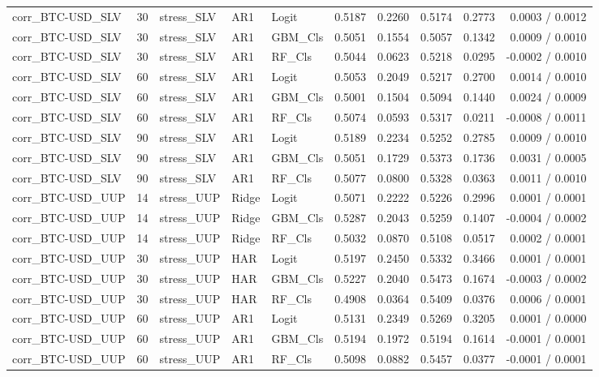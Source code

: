 \begin{table}[H]
\begin{tabular}{lllllrrrrr}
corr_BTC-USD_SLV & 30 & stress_SLV & AR1 & Logit & 0.5187 & 0.2260 & 0.5174 & 0.2773 & 0.0003 / 0.0012 \\
corr_BTC-USD_SLV & 30 & stress_SLV & AR1 & GBM_Cls & 0.5051 & 0.1554 & 0.5057 & 0.1342 & 0.0009 / 0.0010 \\
corr_BTC-USD_SLV & 30 & stress_SLV & AR1 & RF_Cls & 0.5044 & 0.0623 & 0.5218 & 0.0295 & -0.0002 / 0.0010 \\
corr_BTC-USD_SLV & 60 & stress_SLV & AR1 & Logit & 0.5053 & 0.2049 & 0.5217 & 0.2700 & 0.0014 / 0.0010 \\
corr_BTC-USD_SLV & 60 & stress_SLV & AR1 & GBM_Cls & 0.5001 & 0.1504 & 0.5094 & 0.1440 & 0.0024 / 0.0009 \\
corr_BTC-USD_SLV & 60 & stress_SLV & AR1 & RF_Cls & 0.5074 & 0.0593 & 0.5317 & 0.0211 & -0.0008 / 0.0011 \\
corr_BTC-USD_SLV & 90 & stress_SLV & AR1 & Logit & 0.5189 & 0.2234 & 0.5252 & 0.2785 & 0.0009 / 0.0010 \\
corr_BTC-USD_SLV & 90 & stress_SLV & AR1 & GBM_Cls & 0.5051 & 0.1729 & 0.5373 & 0.1736 & 0.0031 / 0.0005 \\
corr_BTC-USD_SLV & 90 & stress_SLV & AR1 & RF_Cls & 0.5077 & 0.0800 & 0.5328 & 0.0363 & 0.0011 / 0.0010 \\
corr_BTC-USD_UUP & 14 & stress_UUP & Ridge & Logit & 0.5071 & 0.2222 & 0.5226 & 0.2996 & 0.0001 / 0.0001 \\
corr_BTC-USD_UUP & 14 & stress_UUP & Ridge & GBM_Cls & 0.5287 & 0.2043 & 0.5259 & 0.1407 & -0.0004 / 0.0002 \\
corr_BTC-USD_UUP & 14 & stress_UUP & Ridge & RF_Cls & 0.5032 & 0.0870 & 0.5108 & 0.0517 & 0.0002 / 0.0001 \\
corr_BTC-USD_UUP & 30 & stress_UUP & HAR & Logit & 0.5197 & 0.2450 & 0.5332 & 0.3466 & 0.0001 / 0.0001 \\
corr_BTC-USD_UUP & 30 & stress_UUP & HAR & GBM_Cls & 0.5227 & 0.2040 & 0.5473 & 0.1674 & -0.0003 / 0.0002 \\
corr_BTC-USD_UUP & 30 & stress_UUP & HAR & RF_Cls & 0.4908 & 0.0364 & 0.5409 & 0.0376 & 0.0006 / 0.0001 \\
corr_BTC-USD_UUP & 60 & stress_UUP & AR1 & Logit & 0.5131 & 0.2349 & 0.5269 & 0.3205 & 0.0001 / 0.0000 \\
corr_BTC-USD_UUP & 60 & stress_UUP & AR1 & GBM_Cls & 0.5194 & 0.1972 & 0.5194 & 0.1614 & -0.0001 / 0.0001 \\
corr_BTC-USD_UUP & 60 & stress_UUP & AR1 & RF_Cls & 0.5098 & 0.0882 & 0.5457 & 0.0377 & -0.0001 / 0.0001 \\

\end{tabular}
\end{table}
